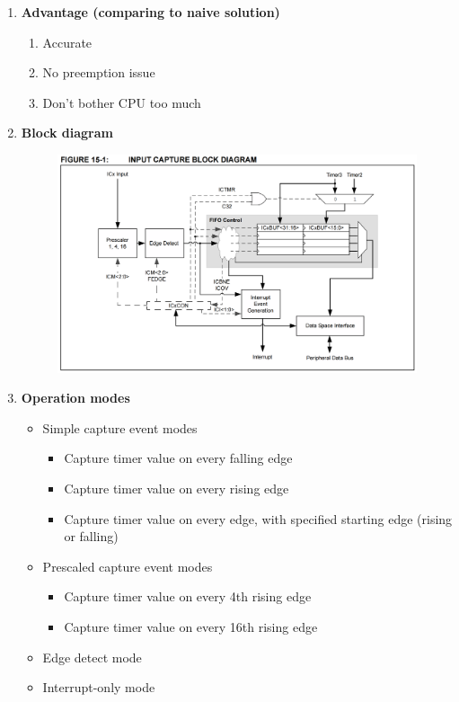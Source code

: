 \documentclass[a4paper]{article}
\begin{document}
  \begin{enumerate}[label = \arabic*.]
    \item \textbf{Advantage (comparing to naive solution)}
      \begin{enumerate}[label = \arabic*.]
        \item Accurate
        \item No preemption issue
        \item Don't bother CPU too much
      \end{enumerate}

    \item \textbf{Block diagram}
      \begin{figure}[H]
        \centering
        \includegraphics[width=0.9\linewidth]{Input_capture_block_diagram.png}
        \label{fig:Input_capture_block_diagram.png}
      \end{figure}

    \item \textbf{Operation modes}
      \begin{itemize}[leftmargin = 1cm]
        \item Simple capture event modes
          \begin{itemize}[leftmargin = 1cm]
            \item Capture timer value on every falling edge
            \item Capture timer value on every rising edge
            \item Capture timer value on every edge, with specified starting edge (rising or falling)
          \end{itemize}
        \item Prescaled capture event modes
          \begin{itemize}[leftmargin = 1cm]
            \item Capture timer value on every 4th rising edge
            \item Capture timer value on every 16th rising edge
          \end{itemize}
        \item Edge detect mode
        \item Interrupt-only mode
      \end{itemize}


\end{enumerate}
\end{document}
